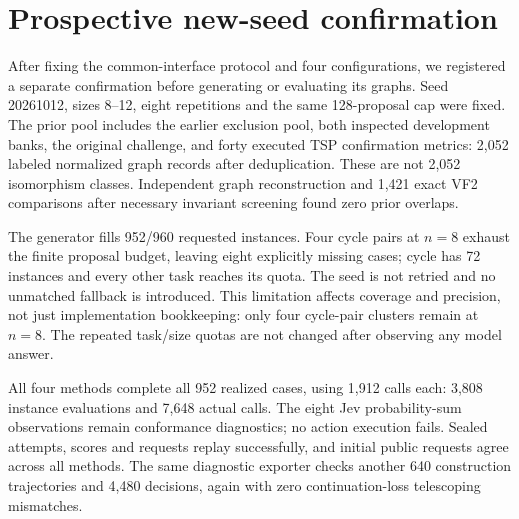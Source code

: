 \section{Prospective new-seed confirmation}
\label{sec:confirmation}
After fixing the common-interface protocol and four configurations, we
registered a separate confirmation before generating or evaluating its
graphs. Seed 20261012, sizes 8--12, eight repetitions and the same 128-proposal
cap were fixed. The prior pool includes the earlier exclusion pool, both
inspected development banks, the original challenge, and forty executed
TSP confirmation metrics: 2,052 labeled normalized graph records after
deduplication. These are not 2,052 isomorphism classes.
Independent graph reconstruction and 1,421 exact VF2 comparisons after
necessary invariant screening found zero prior overlaps.

The generator fills 952/960 requested instances. Four cycle pairs at $n=8$
exhaust the finite proposal budget, leaving eight explicitly missing cases;
cycle has 72 instances and every other task reaches its quota.
The seed is not retried and no unmatched fallback is introduced.
This limitation affects coverage and precision, not just implementation
bookkeeping: only four cycle-pair clusters remain at $n=8$.
The repeated task/size quotas are not changed after observing any model answer.

All four methods complete all 952 realized cases, using 1,912 calls each:
3,808 instance evaluations and 7,648 actual calls. The eight Jev
probability-sum observations remain conformance diagnostics; no action
execution fails. Sealed attempts, scores and requests replay successfully,
and initial public requests agree across all methods. The same diagnostic
exporter checks another 640 construction trajectories and 4,480 decisions,
again with zero continuation-loss telescoping mismatches.

\begin{table}[t]
\centering\small

\caption{Prospective confirmation exact macro-size accuracy (\%).
Cycle has 72 cases, degree 400, and the other binary tasks eighty each.
The macro estimator weights the five sizes equally, not by their case counts.}
\label{tab:confirm-exact}
\end{table}
\begin{table}[t]
\centering\small

\caption{Prospective confirmation optimal solutions over forty scheduled
episodes per construction. All episodes are feasible; classical algorithms
are independently recomputed on these new graphs.}
\label{tab:confirm-optimal}
\end{table}
\begin{table}[t]
\centering\small
\resizebox{\textwidth}{!}{}
\caption{Prospective confirmation mean additive gaps. Uniform columns are
exact policy expectations. No graph, task or method is selected for inclusion
based on its observed score.}
\label{tab:confirm-gap}
\end{table}

